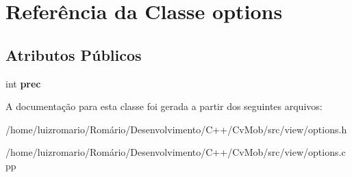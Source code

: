 \hypertarget{classoptions}{
\section{Referência da Classe options}
\label{classoptions}
}
\subsection*{Atributos Públicos}
\begin{DoxyCompactItemize}
\item 
\hypertarget{classoptions_a98fde01a409664ff03269abd8e29d6ac}{
int {\bfseries prec}}
\label{classoptions_a98fde01a409664ff03269abd8e29d6ac}

\end{DoxyCompactItemize}


A documentação para esta classe foi gerada a partir dos seguintes arquivos:\begin{DoxyCompactItemize}
\item 
/home/luizromario/Romário/Desenvolvimento/C++/CvMob/src/view/options.h\item 
/home/luizromario/Romário/Desenvolvimento/C++/CvMob/src/view/options.cpp\end{DoxyCompactItemize}
